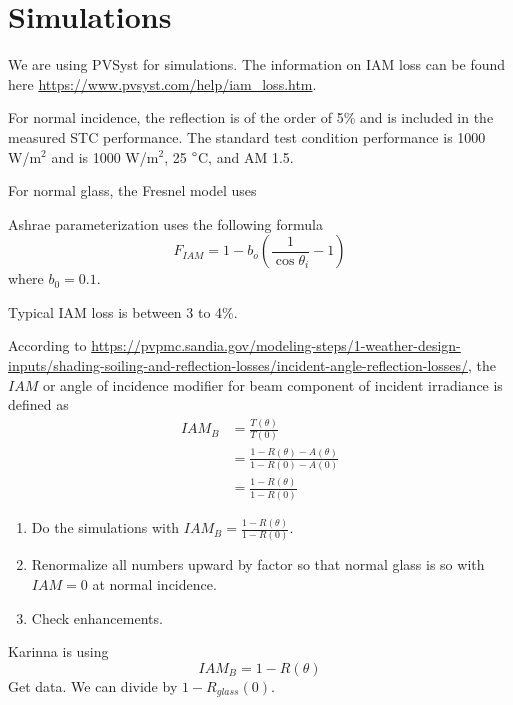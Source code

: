 \documentclass[12pt]{article}
\date{\today }
\author{
Paul W. Leu\\
University of Pittsburgh\\
Pittsburgh, PA}
\numberwithin{equation}{section}
\begin{document}
\tableofcontents

\section{Simulations}

We are using PVSyst for simulations.  
The information on IAM loss can be found here \url{https://www.pvsyst.com/help/iam_loss.htm}.  

For normal incidence, the reflection is of the order of 5\% and is included in the measured STC performance.  
The standard test condition performance is 1000 W/m$^2$ and is 1000 W/m$^2$, 25 $\degree$C, and AM 1.5.  


For normal glass, the Fresnel model uses 

Ashrae parameterization uses the following formula
\begin{equation}
F_{IAM}  =  1  -  b_o \left (\frac{1}{\cos \theta_i} - 1 \right )
\end{equation}
where $b_0 = 0.1$.  

Typical IAM loss is between 3 to 4\%.  

According to \url{https://pvpmc.sandia.gov/modeling-steps/1-weather-design-inputs/shading-soiling-and-reflection-losses/incident-angle-reflection-losses/}, 
the $IAM$ or angle of incidence modifier for beam component of incident irradiance is defined as  
\begin{align}
IAM_B &= \frac{T(\theta)}{T(0)} \\
&= \frac{1 - R(\theta) - A(\theta)}{1 - R(0) - A(0)} \\
&= \frac{1 - R(\theta)}{1 - R(0)} 
\end{align}


\begin{enumerate}
\item Do the simulations with $IAM_B = \frac{1 - R(\theta)}{1 - R(0)}$.  
\item Renormalize all numbers upward by factor so that normal glass is so with $IAM = 0$ at normal incidence.  
\item Check enhancements.  
\end{enumerate}

Karinna is using
\begin{equation}
IAM_B = 1 - R(\theta)
\end{equation}
Get data.  We can divide by $1 - R_{glass} (0)$.  



\end{document}
